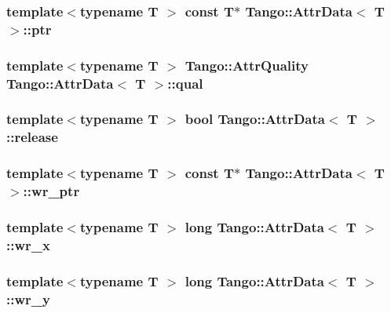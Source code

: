 \subsubsection[{ptr}]{\setlength{\rightskip}{0pt plus 5cm}template$<$typename T $>$ const T$\ast$ {\bf Tango\-::\-Attr\-Data}$<$ T $>$\-::ptr}\label{classTango_1_1AttrData_a2226b793c3a7c4791a9839e5bfa2473f}
\subsubsection[{qual}]{\setlength{\rightskip}{0pt plus 5cm}template$<$typename T $>$ Tango\-::\-Attr\-Quality {\bf Tango\-::\-Attr\-Data}$<$ T $>$\-::qual}\label{classTango_1_1AttrData_a51eecbb56d5db1c611ad459017cc03c2}
\subsubsection[{release}]{\setlength{\rightskip}{0pt plus 5cm}template$<$typename T $>$ bool {\bf Tango\-::\-Attr\-Data}$<$ T $>$\-::release}\label{classTango_1_1AttrData_abc8bb23d7b5e8b2c4c1bd1c67b16ef04}
\subsubsection[{wr\-\_\-ptr}]{\setlength{\rightskip}{0pt plus 5cm}template$<$typename T $>$ const T$\ast$ {\bf Tango\-::\-Attr\-Data}$<$ T $>$\-::wr\-\_\-ptr}\label{classTango_1_1AttrData_a0677f54f22a900522ffe72bd38cd530a}
\subsubsection[{wr\-\_\-x}]{\setlength{\rightskip}{0pt plus 5cm}template$<$typename T $>$ long {\bf Tango\-::\-Attr\-Data}$<$ T $>$\-::wr\-\_\-x}\label{classTango_1_1AttrData_afaaa975dbd7e67efedfc0932d163d9ce}
\subsubsection[{wr\-\_\-y}]{\setlength{\rightskip}{0pt plus 5cm}template$<$typename T $>$ long {\bf Tango\-::\-Attr\-Data}$<$ T $>$\-::wr\-\_\-y}\label{classTango_1_1AttrData_ac4720964bc4cfe1441dbc0e25c368d5a}
